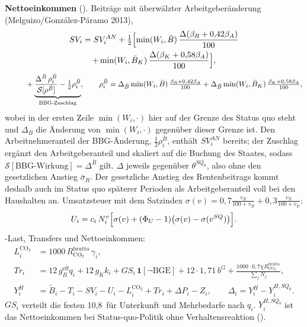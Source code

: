 \textbf{Nettoeinkommen} (). Beiträge mit überwälzter
Arbeitgeberänderung (Melguizo\slash{}González-Páramo 2013),
\begin{multline}
SV_i=SV^{AN}_i+\tfrac12\Bigl[\min(W_i,\bar B)\,\frac{\Delta(\beta_R+0{,}42\beta_A)}{100}\\
+\min(W_i,\bar B_K)\,\frac{\Delta(\beta_K+0{,}58\beta_A)}{100}\Bigr],
\end{multline}
\begin{equation}
\hphantom{SV_i=}{}+\underbrace{\frac{\Delta^{\bar B}\,\rho^{\bar B}_i}{\mathcal S[\rho^{\bar B}]}-\tfrac12\rho^{\bar B}_i}_{\text{BBG-Zuschlag}},\qquad
\rho^{\bar B}_i=\Delta_{\bar B}\min(W_i,\bar B)\,\tfrac{\beta_R+0{,}42\beta_A}{100}+\Delta_{\bar B}\min(W_i,\bar B_K)\,\tfrac{\beta_K+0{,}58\beta_A}{100},
\end{equation}
wobei in der ersten Zeile $\min(W_i,\cdot)$ hier auf der Grenze des Status quo steht und
$\Delta_{\bar B}$ die Änderung von $\min(W_i,\cdot)$ gegenüber dieser Grenze ist. Den
Arbeitnehmeranteil der BBG-Änderung, $\tfrac12\rho^{\bar B}_i$, enthält $SV^{AN}_i$ bereits; der
Zuschlag ergänzt den Arbeitgeberanteil und skaliert auf die Buchung des Staates, sodass
$\mathcal S[\text{BBG-Wirkung}]=\Delta^{\bar B}$ gilt.
$\Delta$ jeweils gegenüber $\theta^{SQ_0}$, also ohne den gesetzlichen Anstieg
$\bar\sigma_R$. Der gesetzliche Anstieg des Rentenbeitrags kommt deshalb auch im Status quo
späterer Perioden als Arbeitgeberanteil voll bei den Haushalten an. Umsatzsteuer mit dem Satzindex
$\sigma(v)=0{,}7\frac{v_R}{100+v_R}+0{,}3\frac{v_E}{100+v_E}$:
\begin{equation}
U_i=c_i\,N^v_i\Bigl[\sigma(v)+(\Phi_U-1)\bigl(\sigma(v)-\sigma(v^{SQ})\bigr)\Bigr].
\end{equation}
\COz-Last, Transfers und Nettoeinkommen:
\begin{align}
L^{\text{CO}_2}_i&=1000\,R^{\text{brutto}}_{\text{CO}_2}\,\gamma_i,\\
\mathit{Tr}_i&=12\,g_B^{\text{eff}}q_i+12\,g_Kk_i+GS_i\,\mathbf 1[\neg\text{BGE}]+12\cdot1{,}71\,b^G
             +\frac{1000\cdot0{,}7\chi R^{\text{brutto}}_{\text{CO}_2}}{\sum_jN_j},\\
Y^H_i&=\tilde B_i-T_i-SV_i-U_i-L^{\text{CO}_2}_i+\mathit{Tr}_i+\Delta P_i-Z_i,\qquad
\Delta_i=Y^H_i-Y^{H,SQ_0}_i.
\end{align}
$GS_i$ verteilt die festen 10,8\,\Mrd{} für Unterkunft und Mehrbedarfe nach $q_i$.
$Y^{H,SQ_0}_i$ ist das Nettoeinkommen bei Status-quo-Politik ohne Verhaltensreaktion
().

